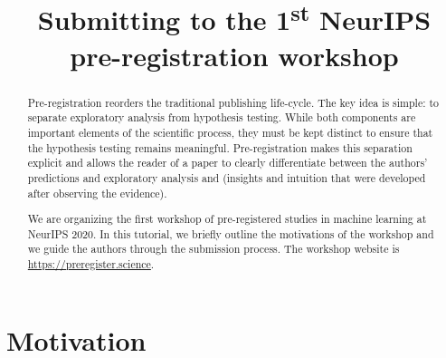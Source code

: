 \documentclass{article}
\title{Submitting to the 1\textsuperscript{st} NeurIPS \\ pre-registration workshop}
\begin{document}
\maketitle

\begin{abstract}
Pre-registration reorders the traditional publishing life-cycle.  The key idea is simple: to separate exploratory analysis from hypothesis testing.
While both components are important elements of the scientific process, they must be kept distinct to ensure that the hypothesis testing remains meaningful.  Pre-registration makes this separation explicit and allows the reader of a paper to clearly differentiate between the authors' predictions and exploratory analysis and  (insights and intuition that were developed after observing the evidence).

We are organizing the first workshop of pre-registered studies in machine learning at NeurIPS 2020.
In this tutorial, we briefly outline the motivations of the workshop and we guide the authors through the submission process.
The workshop website is \url{https://preregister.science}.
\end{abstract}

\section{Motivation}
\label{sec:introduction}
\end{document}
